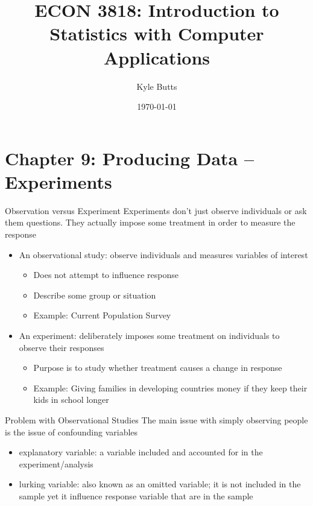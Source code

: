 \documentclass{beamer}
\title{ECON 3818: Introduction to Statistics with Computer Applications}
\date{\today}
\author{Kyle Butts}
\begin{document}
\maketitle




\section{Chapter 9: Producing Data -- Experiments}

\begin{frame}{Observation versus Experiment}
	Experiments don't just observe individuals or ask them questions. They actually impose some treatment in order to measure the response
	\begin{itemize}
		\item An \alert{observational study}: observe individuals and measures variables of interest
		      \begin{itemize} 
		      	\item Does not attempt to influence response 
		      	\item Describe some group or situation
		      	\item Example: Current Population Survey
		      \end{itemize}
		\item An \alert{experiment}: deliberately imposes some treatment on individuals to observe their responses
		      \begin{itemize}
		      	\item Purpose is to study whether treatment causes a change in response 
		      	\item Example: Giving families in developing countries money if they keep their kids in school longer
		      \end{itemize}
	\end{itemize}
\end{frame}

\begin{frame}{Problem with Observational Studies}
	The main issue with simply observing people is the issue of \alert{confounding variables}
	
	\begin{itemize}
		\item \alert{explanatory variable}: a variable included and accounted for in the experiment/analysis 
		\item \alert{lurking variable}: also known as an omitted variable; it is not included in the sample yet it influence response variable that are in the sample 
	\end{itemize}
\end{frame}
\end{document}
